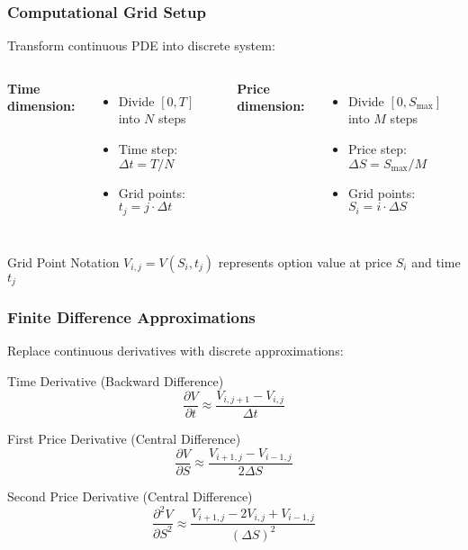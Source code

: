\documentclass{beamer}
\begin{document}
\begin{frame}
\frametitle{Computational Grid Setup}
Transform continuous PDE into discrete system:

\begin{columns}
\textbf{Time dimension:}
\begin{itemize}
\item Divide \([0, T]\) into \(N\) steps
\item Time step: \(\Delta t = T/N\)
\item Grid points: \(t_j = j \cdot \Delta t\)
\end{itemize}

\textbf{Price dimension:}
\begin{itemize}
\item Divide \([0, S_{\max}]\) into \(M\) steps
\item Price step: \(\Delta S = S_{\max}/M\)
\item Grid points: \(S_i = i \cdot \Delta S\)
\end{itemize}

\end{columns}

\begin{block}{Grid Point Notation}
\(V_{i,j} = V(S_i, t_j)\) represents option value at price \(S_i\) and time \(t_j\)
\end{block}
\end{frame}

\begin{frame}
\frametitle{Finite Difference Approximations}
Replace continuous derivatives with discrete approximations:

\begin{block}{Time Derivative (Backward Difference)}
\[\frac{\partial V}{\partial t} \approx \frac{V_{i,j+1} - V_{i,j}}{\Delta t}\]
\end{block}

\begin{block}{First Price Derivative (Central Difference)}
\[\frac{\partial V}{\partial S} \approx \frac{V_{i+1,j} - V_{i-1,j}}{2\Delta S}\]
\end{block}

\begin{block}{Second Price Derivative (Central Difference)}
\[\frac{\partial^2 V}{\partial S^2} \approx \frac{V_{i+1,j} - 2V_{i,j} + V_{i-1,j}}{(\Delta S)^2}\]
\end{block}
\end{frame}
\end{document}
